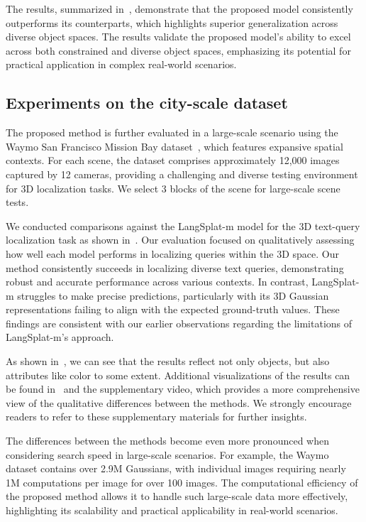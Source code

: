 The results, summarized in~, demonstrate that the proposed model consistently outperforms its counterparts, which highlights superior generalization across diverse object spaces. The results validate the proposed model's ability to excel across both constrained and diverse object spaces, emphasizing its potential for practical application in complex real-world scenarios.



\subsection{Experiments on the city-scale dataset}
\label{city scale}




The proposed method is further evaluated in a large-scale scenario using the Waymo San Francisco Mission Bay dataset~\cite{tancik2022blocknerf}, which features expansive spatial contexts. For each scene, the dataset comprises approximately 12,000 images captured by 12 cameras, providing a challenging and diverse testing environment for 3D localization tasks. We select 3 blocks of the scene for large-scale scene tests.

We conducted comparisons against the LangSplat-m model for the 3D text-query localization task as shown in~. Our evaluation focused on qualitatively assessing how well each model performs in localizing queries within the 3D space. Our method consistently succeeds in localizing diverse text queries, demonstrating robust and accurate performance across various contexts. In contrast, LangSplat-m struggles to make precise predictions, particularly with its 3D Gaussian representations failing to align with the expected ground-truth values. These findings are consistent with our earlier observations regarding the limitations of LangSplat-m's approach.

As shown in~, we can see that the results reflect not only objects, but also attributes like color to some extent. Additional visualizations of the results can be found in~ and the supplementary video, which provides a more comprehensive view of the qualitative differences between the methods. We strongly encourage readers to refer to these supplementary materials for further insights.

The differences between the methods become even more pronounced when considering search speed in large-scale scenarios. 
For example, the Waymo dataset contains over 2.9M Gaussians, with individual images requiring nearly 1M computations per image for over 100 images. The computational efficiency of the proposed method allows it to handle such large-scale data more effectively, highlighting its scalability and practical applicability in real-world scenarios.